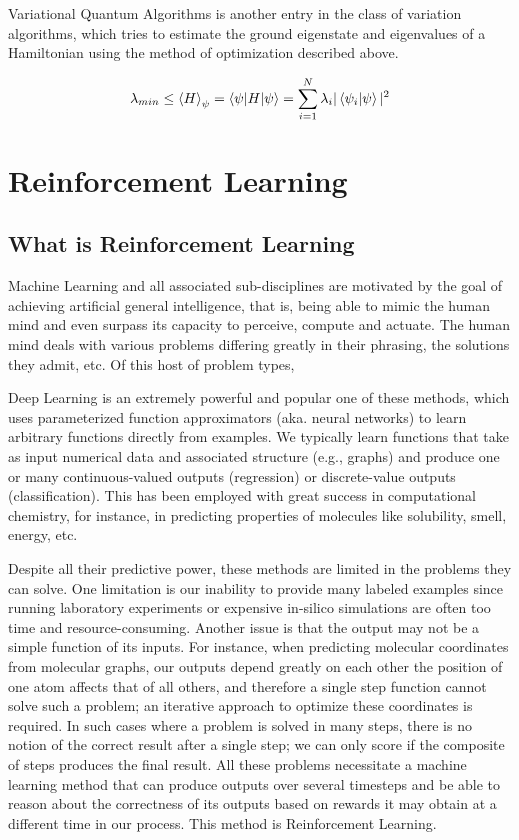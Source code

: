 Variational Quantum Algorithms is another entry in the class of variation algorithms, which tries to estimate the ground eigenstate and eigenvalues of a Hamiltonian using the method of optimization described above.

\begin{equation}
    \lambda_{min} \leq \braket{H}_{\psi} = \braket{\psi \vert H \vert \psi} = \sum_{i=1}^{N} \lambda_i \vert \braket{\psi_i \vert \psi} \vert ^2
\end{equation}

\section{Reinforcement Learning}

\subsection{What is Reinforcement Learning}

Machine Learning and all associated sub-disciplines are motivated by the goal of achieving artificial general intelligence, that is, being able to mimic the human mind and even surpass its capacity to perceive, compute and actuate. The human mind deals with various problems differing greatly in their phrasing, the solutions they admit, etc. Of this host of problem types, 

Deep Learning is an extremely powerful and popular one of these methods, which uses parameterized function approximators (aka. neural networks) to learn arbitrary functions directly from examples. We typically learn functions that take as input numerical data and associated structure (e.g., graphs) and produce one or many continuous-valued outputs (regression) or discrete-value outputs (classification). This has been employed with great success in computational chemistry, for instance, in predicting properties of molecules like solubility, smell, energy, etc.

Despite all their predictive power, these methods are limited in the problems they can solve. One limitation is our inability to provide many labeled examples since running laboratory experiments or expensive in-silico simulations are often too time and resource-consuming. Another issue is that the output may not be a simple function of its inputs. For instance, when predicting molecular coordinates from molecular graphs, our outputs depend greatly on each other the position of one atom affects that of all others, and therefore a single step function cannot solve such a problem; an iterative approach to optimize these coordinates is required. In such cases where a problem is solved in many steps, there is no notion of the correct result after a single step; we can only score if the composite of steps produces the final result. All these problems necessitate a machine learning method that can produce outputs over several timesteps and be able to reason about the correctness of its outputs based on rewards it may obtain at a different time in our process. This method is Reinforcement Learning. \cite{rl-intro-sutton-barto}


